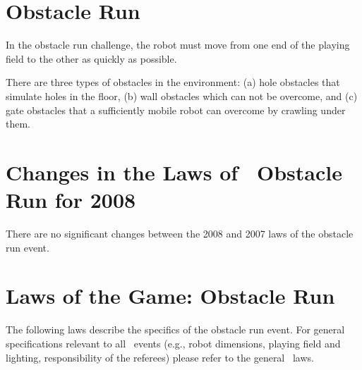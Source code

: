 \documentclass[12pt]{hurocup}
\begin{document}
\newpage

\section{Obstacle Run}
\label{subsec:obstacle-run} 

In the obstacle run challenge, the robot must move from one end of the
playing field to the other as quickly as possible.

There are three types of obstacles in the environment: (a) hole
obstacles that simulate holes in the floor, (b) wall obstacles which
can not be overcome, and (c) gate obstacles that a sufficiently mobile
robot can overcome by crawling under them.

\section{Changes in the Laws of \HuroCup\ Obstacle Run for 2008}

There are no significant changes between the 2008 and 2007 laws of the
obstacle run event.

\section{Laws of the Game: Obstacle Run}
\label{sec:laws-obstacle-run}

The following laws describe the specifics of the obstacle run
event. For general specifications relevant to all \HuroCup\ events
(e.g., robot dimensions, playing field and lighting, responsibility of
the referees) please refer to the general \HuroCup\ laws.

\label{law:or-field}
\end{document}
